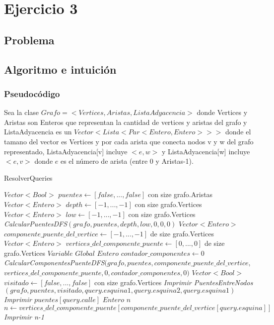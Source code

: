 \section{Ejercicio 3}

\subsection{Problema}

\subsection{Algoritmo e intuición}

\subsubsection*{Pseudocódigo}

Sea la clase $Grafo = <Vertices, Aristas, ListaAdyacencia>$
	donde Vertices y Aristas son Enteros que representan la cantidad de vertices y aristas del grafo y
	ListaAdyacencia es un $Vector<Lista<Par<Entero, Entero>>>$ donde
	el tamano del vector es Vertices y por cada arista que conecta nodos v 
	y w del grafo representado, ListaAdyacencia[v] incluye $<e, w>$ y
	ListaAdyacencia[w] incluye $<e, v>$ donde $e$ es el número de arista (entre 0 y Aristas-1).

\begin{algorithm}[]
    \caption{ResolverQueries}
    $Vector<Bool>$ $puentes \gets [false,...,false]$ con size grafo.Aristas \;
	$Vector<Entero>$ $depth \gets [-1,...,-1]$ con size grafo.Vertices \;
	$Vector<Entero>$ $low \gets [-1,...,-1]$ con size grafo.Vertices \;
	\emph{CalcularPuentesDFS$(grafo, puentes, depth, low, 0, 0, 0)$} \;
	$Vector<Entero>$ $componente\_puente\_del\_vertice \gets [-1,...,-1]$ de size grafo.Vertices \;
	$Vector<Entero>$ $vertices\_del\_componente\_puente \gets [0,...,0]$ de size grafo.Vertices \;
	$Variable$ $Global$ $Entero$ $contador\_componentes \gets 0$ \;
	\emph{CalcularComponentesPuenteDFS$(grafo, puentes, componente\_puente\_del\_vertice, $ $ vertices\_del\_componente\_puente, 0, contador\_componentes, 0)$} \;
	 {
		 {
			$Vector<Bool>$ $visitado \gets [false,...,false]$ con size grafo.Vertices \;
			\emph{Imprimir PuentesEntreNodos$(grafo, puentes, visitado, query.esquina1, query.esquina2, query.esquina1)$}
		}
		 {
			\emph{Imprimir $puentes[query.calle]$}
		}
		 {
			$Entero$ $n$ \;
			$n \gets vertices\_del\_componente\_puente[componente\_puente\_del\_vertice[query.esquina]]$ \;
			\emph{Imprimir n-1}
		}
	}
\end{algorithm}

